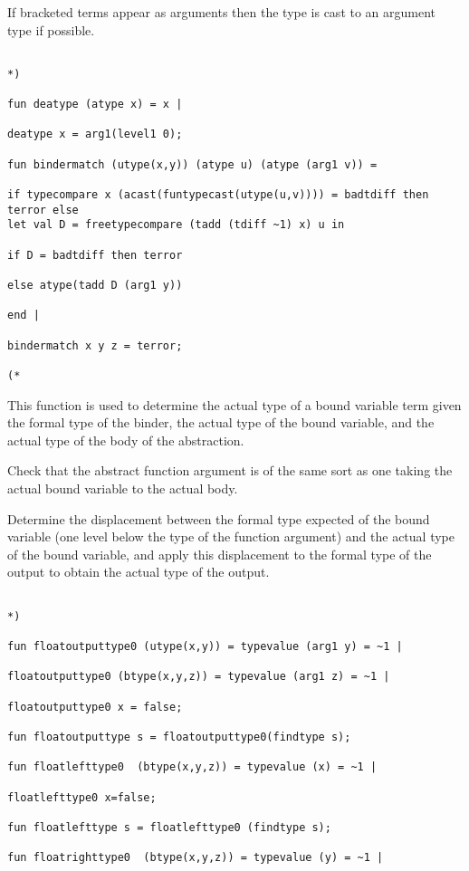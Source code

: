 \documentclass{article}
\begin{document}
{{If bracketed terms appear as arguments then the type is cast to an argument type if possible.

\begin{verbatim}

*)

fun deatype (atype x) = x |

deatype x = arg1(level1 0);

fun bindermatch (utype(x,y)) (atype u) (atype (arg1 v)) =

if typecompare x (acast(funtypecast(utype(u,v)))) = badtdiff then terror else
let val D = freetypecompare (tadd (tdiff ~1) x) u in

if D = badtdiff then terror

else atype(tadd D (arg1 y))

end |

bindermatch x y z = terror;

(*

\end{verbatim}

This function is used to determine the actual type of a bound variable term given the formal type of the binder,
the actual type of the bound variable, and the actual type of the body of the  abstraction.

Check that the abstract function argument is of the same sort as one taking the actual
bound variable to the actual body.

Determine the displacement between the formal type expected of the bound variable
(one level below the type of the function argument) and the actual type of the bound variable,
and apply this displacement to the formal type of the output to obtain the actual type of the output.

\begin{verbatim}

*)

fun floatoutputtype0 (utype(x,y)) = typevalue (arg1 y) = ~1 |

floatoutputtype0 (btype(x,y,z)) = typevalue (arg1 z) = ~1 |

floatoutputtype0 x = false;

fun floatoutputtype s = floatoutputtype0(findtype s);

fun floatlefttype0  (btype(x,y,z)) = typevalue (x) = ~1 |

floatlefttype0 x=false;

fun floatlefttype s = floatlefttype0 (findtype s);

fun floatrighttype0  (btype(x,y,z)) = typevalue (y) = ~1 |


\end{verbatim}}}
\end{document}
